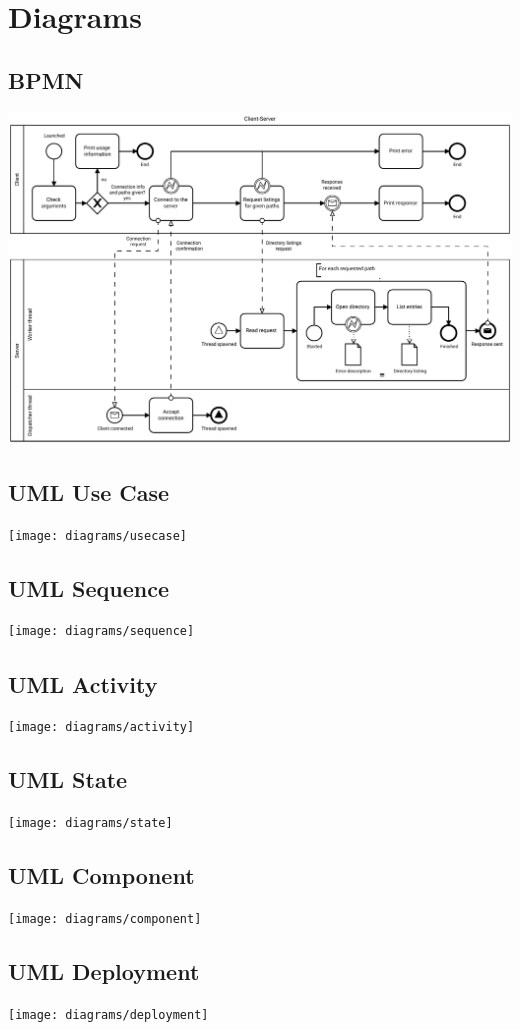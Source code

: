 \documentclass[en, listings]{labreport}
\begin{document}
\section*{Diagrams}

\subsection*{BPMN}
\noindent
\includegraphics[width=\textwidth]{diagrams/bpmn}

\subsection*{UML Use Case}
\noindent
\texttt{[image: diagrams/usecase]}

\subsection*{UML Sequence}
\noindent
\texttt{[image: diagrams/sequence]}

\subsection*{UML Activity}
\noindent
\texttt{[image: diagrams/activity]}

\begin{multicols}{2}

\subsection*{UML State}
\noindent
\texttt{[image: diagrams/state]}

\subsection*{UML Component}
\noindent
\texttt{[image: diagrams/component]}

\end{multicols}

\subsection*{UML Deployment}
\noindent
\texttt{[image: diagrams/deployment]}
\end{document}
